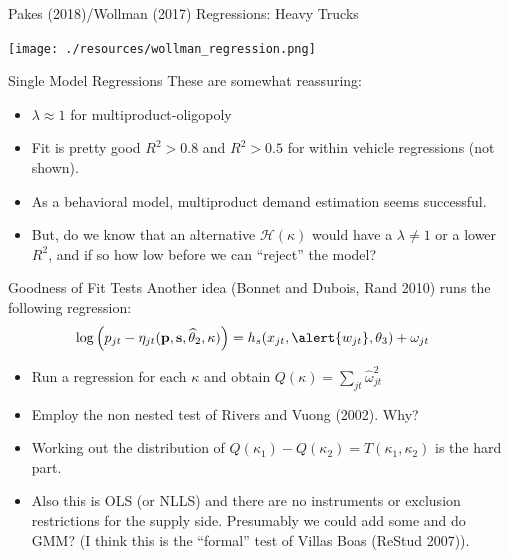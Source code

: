 \documentclass[xcolor=pdftex,dvipsnames,table,mathserif,aspectratio=169]{beamer}
\begin{document}
\begin{frame}{Pakes (2018)/Wollman (2017) Regressions: Heavy Trucks}
\begin{center}
\texttt{[image: ./resources/wollman\_regression.png]}
\end{center}
\end{frame}

\begin{frame}{Single Model Regressions}
These are somewhat reassuring:
\begin{itemize}
\item $\lambda\approx 1$ for multiproduct-oligopoly
\item Fit is pretty good $R^2 > 0.8$ and $R^2 > 0.5$ for within vehicle regressions (not shown).
\item As a behavioral model, multiproduct demand estimation seems successful.
\item But, do we know that an alternative $\mathcal{H}(\kappa)$ would have a $\lambda \neq 1$ or a lower $R^2$, and if so how low before we can ``reject'' the model?
\end{itemize}
\end{frame}

\begin{frame}{Goodness of Fit Tests}
Another idea (Bonnet and Dubois, Rand 2010) runs the following regression:
\begin{align*}
\log \left( p_{jt} - \eta_{jt}(\mathbf{p},\mathbf{s},\widehat{\theta}_2,\kappa) \right) &= h_s(x_{jt}, \alert{w_{jt}},\theta_3) + \omega_{jt}
\end{align*}
\begin{itemize}
\item Run a regression for each $\kappa$ and obtain $Q(\kappa)=\sum_{jt} \widehat{\omega}_{jt}^2$
\item Employ the \alert{non nested test} of Rivers and Vuong (2002). Why?
\item Working out the distribution of $Q(\kappa_1) - Q(\kappa_2)=T(\kappa_1,\kappa_2)$ is the hard part.
\item Also this is OLS (or NLLS) and there are no instruments or \alert{exclusion restrictions} for the supply side. Presumably we could add some and do GMM? (I think this is the ``formal'' test of Villas Boas (ReStud 2007)).
\end{itemize}
\end{frame}
\end{document}
